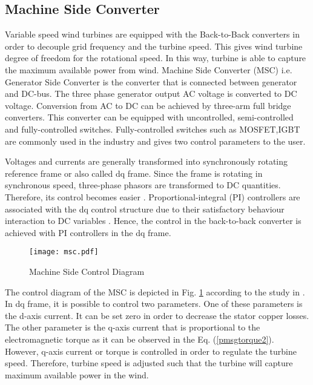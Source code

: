 \subsection{Machine Side Converter}
Variable speed wind turbines are equipped with the Back-to-Back converters in order to decouple grid frequency and the turbine speed. This gives wind turbine degree of freedom for the rotational speed. In this way, turbine is able to capture the maximum available power from wind. Machine Side Converter (MSC) i.e. Generator Side Converter is the converter that is connected between generator and DC-bus. The three phase generator output AC voltage is converted to DC voltage.
Conversion from AC to DC can be achieved by three-arm full bridge converters. This converter can be equipped with uncontrolled, semi-controlled and fully-controlled switches. Fully-controlled switches such as MOSFET,IGBT are commonly used in the industry and gives two control parameters to the user. \par
Voltages and currents are generally transformed into synchronously rotating reference frame or also called dq frame. Since the frame is rotating in synchronous speed, three-phase phasors are transformed to DC quantities. Therefore, its control becomes easier \cite{Kazmierkowski2002}. Proportional-integral (PI) controllers are associated with the dq control structure due to their satisfactory behaviour interaction to DC variables \cite{Blaabjerg2006a}. Hence, the control in the back-to-back converter is achieved with PI controllers in the dq frame. \par
\begin{figure}[h!]
	\centering
	\texttt{[image: msc.pdf]}
	\caption{Machine Side Control Diagram}
	\label{msc}
\end{figure}
The control diagram of the MSC is depicted in Fig. \ref{msc} according to the study in \cite{Chinchilla2006}. In dq frame, it is possible to control two parameters. One of these parameters is the d-axis current. It can be set zero in order to decrease the stator copper losses. The other parameter is the q-axis current that is proportional to the electromagnetic torque as it can be observed in the Eq. (\ref{pmsgtorque2}). However, q-axis current or torque is controlled in order to regulate the turbine speed. Therefore, turbine speed is adjusted such that the turbine will capture maximum available power in the wind. 
